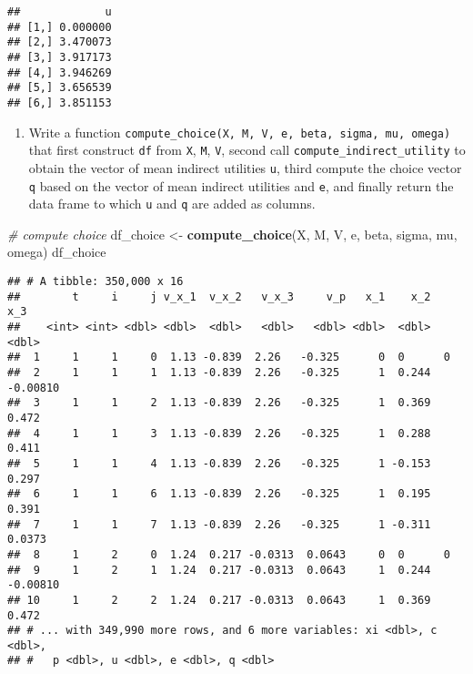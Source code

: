\documentclass[
]{book}
\newenvironment{Shaded}{\begin{snugshade}}{\end{snugshade}}
\newcommand{\CommentTok}[1]{\textcolor[rgb]{0.56,0.35,0.01}{\textit{#1}}}
\newcommand{\KeywordTok}[1]{\textcolor[rgb]{0.13,0.29,0.53}{\textbf{#1}}}
\newcommand{\NormalTok}[1]{#1}
\newcommand{\StringTok}[1]{\textcolor[rgb]{0.31,0.60,0.02}{#1}}
\providecommand{\tightlist}{%
  \setlength{\itemsep}{0pt}\setlength{\parskip}{0pt}}
\begin{document}
\begin{verbatim}
##             u
## [1,] 0.000000
## [2,] 3.470073
## [3,] 3.917173
## [4,] 3.946269
## [5,] 3.656539
## [6,] 3.851153
\end{verbatim}

\begin{enumerate}
\def\labelenumi{\arabic{enumi}.}
\setcounter{enumi}{7}
\tightlist
\item
  Write a function \texttt{compute\_choice(X,\ M,\ V,\ e,\ beta,\ sigma,\ mu,\ omega)} that first construct \texttt{df} from \texttt{X}, \texttt{M}, \texttt{V}, second call \texttt{compute\_indirect\_utility} to obtain the vector of mean indirect utilities \texttt{u}, third compute the choice vector \texttt{q} based on the vector of mean indirect utilities and \texttt{e}, and finally return the data frame to which \texttt{u} and \texttt{q} are added as columns.
\end{enumerate}

\begin{Shaded}
\begin{Highlighting}[]
\CommentTok{# compute choice}
\NormalTok{df_choice <-}\StringTok{ }
\StringTok{  }\KeywordTok{compute_choice}\NormalTok{(X, M, V, e, beta, sigma, }
\NormalTok{                 mu, omega)}
\NormalTok{df_choice}
\end{Highlighting}
\end{Shaded}

\begin{verbatim}
## # A tibble: 350,000 x 16
##        t     i     j v_x_1  v_x_2   v_x_3     v_p   x_1    x_2      x_3
##    <int> <int> <dbl> <dbl>  <dbl>   <dbl>   <dbl> <dbl>  <dbl>    <dbl>
##  1     1     1     0  1.13 -0.839  2.26   -0.325      0  0      0      
##  2     1     1     1  1.13 -0.839  2.26   -0.325      1  0.244 -0.00810
##  3     1     1     2  1.13 -0.839  2.26   -0.325      1  0.369  0.472  
##  4     1     1     3  1.13 -0.839  2.26   -0.325      1  0.288  0.411  
##  5     1     1     4  1.13 -0.839  2.26   -0.325      1 -0.153  0.297  
##  6     1     1     6  1.13 -0.839  2.26   -0.325      1  0.195  0.391  
##  7     1     1     7  1.13 -0.839  2.26   -0.325      1 -0.311  0.0373 
##  8     1     2     0  1.24  0.217 -0.0313  0.0643     0  0      0      
##  9     1     2     1  1.24  0.217 -0.0313  0.0643     1  0.244 -0.00810
## 10     1     2     2  1.24  0.217 -0.0313  0.0643     1  0.369  0.472  
## # ... with 349,990 more rows, and 6 more variables: xi <dbl>, c <dbl>,
## #   p <dbl>, u <dbl>, e <dbl>, q <dbl>
\end{verbatim}
\end{document}
